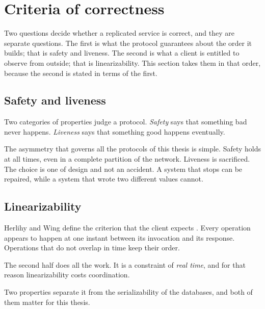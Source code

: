 \section{Criteria of correctness}
\label{sec:correctness}

Two questions decide whether a replicated service is correct, and they
are separate questions. The first is what the protocol guarantees about
the order it builds; that is safety and liveness. The second is what a
client is entitled to observe from outside; that is linearizability.
This section takes them in that order, because the second is stated in
terms of the first.

\subsection{Safety and liveness}

Two categories of properties judge a protocol. \emph{Safety} says that
something bad never happens. \emph{Liveness} says that something good
happens eventually.

The asymmetry that governs all the protocols of this thesis is simple.
Safety holds at all times, even in a complete partition of the network.
Liveness is sacrificed. The choice is one of design and not an accident.
A system that stops can be repaired, while a system that wrote two
different values cannot.

\subsection{Linearizability}

Herlihy and Wing define the criterion that the client expects
\cite{herlihy1990linearizability}. Every operation appears to happen at
one instant between its invocation and its response. Operations that do
not overlap in time keep their order.

The second half does all the work. It is a constraint of \emph{real
time}, and for that reason linearizability costs coordination.

Two properties separate it from the serializability of the databases,
and both of them matter for this thesis.

